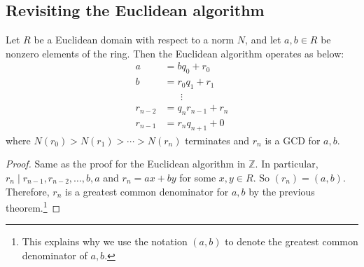 \documentclass{article}
\theoremstyle{plain}
\newcommand{\Z}{\mathbb{Z}}
\begin{document}
\subsection{Revisiting the Euclidean algorithm}
\begin{theorem}{}{}
	Let $R$ be a Euclidean domain with respect to a norm $N$, and let $a,b \in R$ be nonzero elements of the ring. Then the Euclidean algorithm operates as below:
	\begin{align*}
	 a &= bq_0 + r_0 \\	
	 b &= r_0q_1 + r_1 \\
	 &\phantom{test}\vdots \\
	 r_{n-2} &= q_nr_{n-1} + r_n \\
	 r_{n-1} &= r_nq_{n+1} + 0
	\end{align*}
	where $N(r_0) > N(r_1) > \cdots > N(r_n)$ terminates and $r_n$ is a GCD for $a,b$.
\end{theorem}
\begin{proof}
	Same as the proof for the Euclidean algorithm in $\Z$. In particular, $r_n\mid r_{n-1}, r_{n-2},\ldots,b,a$ and $r_n = ax + by$ for some $x,y \in R$. So $(r_n) = (a,b)$. Therefore, $r_n$ is a greatest common denominator for $a,b$ by the previous theorem.\footnote{This explains why we use the notation $(a,b)$ to denote the greatest common denominator of $a,b$.}
\end{proof}
\end{document}
